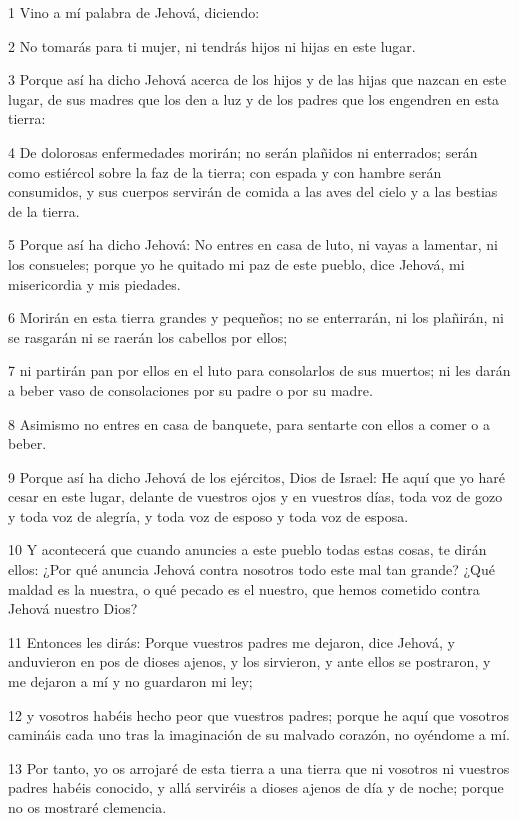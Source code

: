 \par 1 Vino a mí palabra de Jehová, diciendo:
\par 2 No tomarás para ti mujer, ni tendrás hijos ni hijas en este lugar.
\par 3 Porque así ha dicho Jehová acerca de los hijos y de las hijas que nazcan en este lugar, de sus madres que los den a luz y de los padres que los engendren en esta tierra:
\par 4 De dolorosas enfermedades morirán; no serán plañidos ni enterrados; serán como estiércol sobre la faz de la tierra; con espada y con hambre serán consumidos, y sus cuerpos servirán de comida a las aves del cielo y a las bestias de la tierra.
\par 5 Porque así ha dicho Jehová: No entres en casa de luto, ni vayas a lamentar, ni los consueles; porque yo he quitado mi paz de este pueblo, dice Jehová, mi misericordia y mis piedades.
\par 6 Morirán en esta tierra grandes y pequeños; no se enterrarán, ni los plañirán, ni se rasgarán ni se raerán los cabellos por ellos;
\par 7 ni partirán pan por ellos en el luto para consolarlos de sus muertos; ni les darán a beber vaso de consolaciones por su padre o por su madre.
\par 8 Asimismo no entres en casa de banquete, para sentarte con ellos a comer o a beber.
\par 9 Porque así ha dicho Jehová de los ejércitos, Dios de Israel: He aquí que yo haré cesar en este lugar, delante de vuestros ojos y en vuestros días, toda voz de gozo y toda voz de alegría, y toda voz de esposo y toda voz de esposa.
\par 10 Y acontecerá que cuando anuncies a este pueblo todas estas cosas, te dirán ellos: ¿Por qué anuncia Jehová contra nosotros todo este mal tan grande? ¿Qué maldad es la nuestra, o qué pecado es el nuestro, que hemos cometido contra Jehová nuestro Dios?
\par 11 Entonces les dirás: Porque vuestros padres me dejaron, dice Jehová, y anduvieron en pos de dioses ajenos, y los sirvieron, y ante ellos se postraron, y me dejaron a mí y no guardaron mi ley;
\par 12 y vosotros habéis hecho peor que vuestros padres; porque he aquí que vosotros camináis cada uno tras la imaginación de su malvado corazón, no oyéndome a mí.
\par 13 Por tanto, yo os arrojaré de esta tierra a una tierra que ni vosotros ni vuestros padres habéis conocido, y allá serviréis a dioses ajenos de día y de noche; porque no os mostraré clemencia.
